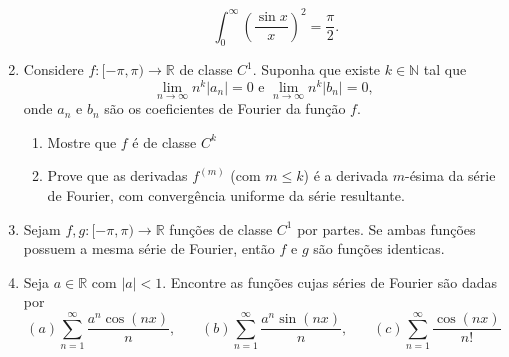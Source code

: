 \documentclass{article}
\begin{document}
\begin{enumerate}
\begin{enumerate}
        $$ \int_{0}^{\infty} \left(\frac{\sin x}{x}\right)^2=\frac{\pi}{2}.   $$
        \end{enumerate}  
      \item Considere $f : [-\pi,\pi)\rightarrow \mathbb{R}$
      de classe $C^1$. Suponha que existe $k \in \mathbb{N}$
      tal que 
      $$
        \lim_{n \rightarrow \infty} n^{k}|a_n|=0 
        \text{ e } 
        \lim_{n \rightarrow \infty} n^{k}|b_n|=0, 
      $$  
      onde $a_n$ e $b_n$ são os coeficientes de 
      Fourier da função $f$. 
        \begin{enumerate}
        \item Mostre que $f$ é de classe $C^k$
        \item Prove que as derivadas $f^{(m)}$ (com $m \leq k$)
        é a derivada $m$-ésima da série de Fourier,  
        com convergência uniforme da série resultante.
        \end{enumerate}         
      \item Sejam $f,g : [-\pi,\pi)\rightarrow \mathbb{R}$
      funções de classe $C^1$ por partes. 
      Se ambas funções possuem a mesma
      série de Fourier, então $f$ e $g$ são funções identicas.                
      \item Seja $a \in \mathbb{R}$ com $|a|<1$. 
      Encontre as funções cujas séries de Fourier 
      são dadas por
     $$
       (a) \sum_{n=1}^{\infty} \frac{a^n \cos(nx)}{n}, \ \ \ \ \ \ \ \ 
       (b) \sum_{n=1}^{\infty} \frac{a^n \sin(nx)}{n}, \ \ \ \ \ \ \ \
       (c) \sum_{n=1}^{\infty} \frac{\cos(nx)}{n!}
     $$                    
      \end{enumerate}
\end{document}
